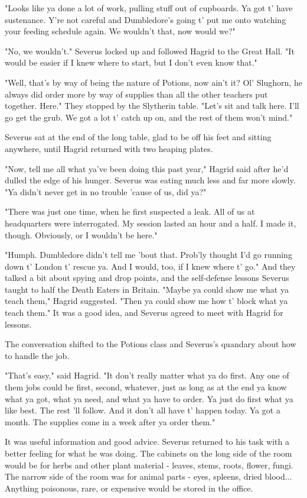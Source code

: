 \documentclass[a4paper,11pt]{article}
\begin{document}
"Looks like ya done a lot of work, pulling stuff out of cupboards. Ya got t' have sustenance. Y're not careful and Dumbledore's going t' put me onto watching your feeding schedule again. We wouldn't that, now would we?"

"No, we wouldn't." Severus locked up and followed Hagrid to the Great Hall. "It would be easier if I knew where to start, but I don't even know that."

"Well, that's by way of being the nature of Potions, now ain't it? Ol' Slughorn, he always did order more by way of supplies than all the other teachers put together. Here." They stopped by the Slytherin table. "Let's sit and talk here. I'll go get the grub. We got a lot t' catch up on, and the rest of them won't mind."

Severus sat at the end of the long table, glad to be off his feet and sitting anywhere, until Hagrid returned with two heaping plates.

"Now, tell me all what ya've been doing this past year," Hagrid said after he'd dulled the edge of his hunger. Severus was eating much less and far more slowly. "Ya didn't never get in no trouble 'cause of us, did ya?"

"There was just one time, when he first suspected a leak. All of us at headquarters were interrogated. My session lasted an hour and a half. I made it, though. Obviously, or I wouldn't be here."

"Humph. Dumbledore didn't tell me 'bout that. Prob'ly thought I'd go running down t' London t' rescue ya. And I would, too, if I knew where t' go." And they talked a bit about spying and drop points, and the self-defense lessons Severus taught to half the Death Eaters in Britain. "Maybe ya could show me what ya teach them," Hagrid suggested. "Then ya could show me how t' block what ya teach them." It was a good idea, and Severus agreed to meet with Hagrid for lessons.

The conversation shifted to the Potions class and Severus's quandary about how to handle the job.

"That's easy," said Hagrid. "It don't really matter what ya do first. Any one of them jobs could be first, second, whatever, just as long as at the end ya know what ya got, what ya need, and what ya have to order. Ya just do first what ya like best. The rest 'll follow. And it don't all have t' happen today. Ya got a month. The supplies come in a week after ya order them."

It was useful information and good advice. Severus returned to his task with a better feeling for what he was doing. The cabinets on the long side of the room would be for herbs and other plant material - leaves, stems, roots, flower, fungi. The narrow side of the room was for animal parts - eyes, spleens, dried blood... Anything poisonous, rare, or expensive would be stored in the office.
\end{document}

